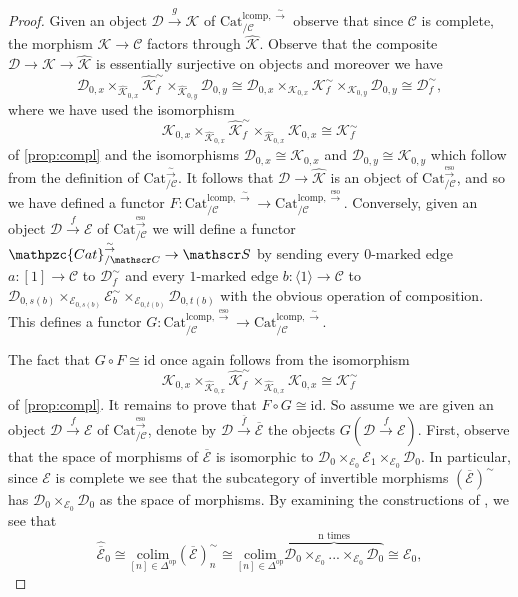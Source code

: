 \documentclass[a4paper, reqno]{amsart}
\theoremstyle{definition}
\newcommand\cC{\mathscr C}
\newcommand\cD{\mathscr D}
\newcommand\cE{\mathscr E}
\newcommand\cK{\mathscr K}
\newcommand\cS{\mathscr S}
\newcommand\id{\mathrm{id}}
\newcommand\op{\mathrm{op}}
\newcommand\cat{\mathrm{Cat}}
\newcommand\lcomp{\mathrm{lcomp}}
\newcommand\ccat{\mathpzc{Cat}}
\newcommand\colim{\mathrm{colim}}
\newcommand\wrr{{\overset{\sim}{\rightarrow}}}
\newcommand\eso{\mathrm{eso}}
\begin{document}
\begin{proof}
Given an object $\cD\xrightarrow{g}\cK$ of $\cat^{\lcomp,\wrr}_{/\cC}$ observe that since $\cC$ is complete, the morphism $\cK\rightarrow\cC$ factors through $\widehat{\cK}$. Observe that the composite $\cD\rightarrow\cK\rightarrow\widehat{\cK}$ is essentially surjective on objects and moreover we have 
\[\cD_{0,x}\times_{\widehat{\cK}_{0,x}}\widehat{\cK}^\sim_f\times_{\widehat{\cK}_{0,y}}\cD_{0,y}\cong \cD_{0,x}\times_{\cK_{0,x}}\cK^\sim_f\times_{\cK_{0,y}}\cD_{0,y}\cong\cD^\sim_f,\]
where we have used the isomorphism \[\cK_{0,x}\times_{\widehat{\cK}_{0,x}}\widehat{\cK}^\sim_f\times_{\widehat{\cK}_{0,x}}\cK_{0,x}\cong\cK^\sim_f\]
of \cref{prop:compl} and the isomorphisms $\cD_{0,x}\cong\cK_{0,x}$ and $\cD_{0,y}\cong\cK_{0,y}$ which follow from the definition of $\cat^\wrr_{/\cC}$. It follows that $\cD\rightarrow\widehat{\cK}$ is an object of $\cat^{\overset{\eso}{\rightarrow}}_{/\cC}$, and so we have defined a functor $F:\cat^{\lcomp,\wrr}_{/\cC}\rightarrow\cat^{\lcomp,\overset{\eso}{\rightarrow}}_{/\cC}$. Conversely, given an object $\cD\xrightarrow{f}\cE$ of $\cat^{\overset{\eso}{\rightarrow}}_{/\cC}$ we will define a functor $\ccat^\wrr_{/\cC}\rightarrow\cS$ by sending every $0$-marked edge $a:[1]\rightarrow\cC$ to $\cD^\sim_f$ and every $1$-marked edge $b:\langle1\rangle\rightarrow\cC$ to $\cD_{0,s(b)}\times_{\cE_{0,s(b)}}\cE^\sim_b\times_{\cE_{0,t(b)}}\cD_{0,t(b)}$ with the obvious operation of composition. This defines a functor $G:\cat^{\lcomp,\overset{\eso}{\rightarrow}}_{/\cC}\rightarrow\cat^{\lcomp,\wrr}_{/\cC}$.\par
The fact that $G\circ F\cong\id$ once again follows from the isomorphism \[\cK_{0,x}\times_{\widehat{\cK}_{0,x}}\widehat{\cK}^\sim_f\times_{\widehat{\cK}_{0,x}}\cK_{0,x}\cong\cK^\sim_f\]
of \cref{prop:compl}. It remains to prove that $F\circ G\cong\id$. So assume we are given an object $\cD\xrightarrow{f}\cE$ of $\cat^{\overset{\eso}{\rightarrow}}_{/\cC}$, denote by $\cD\xrightarrow{\overline{f}}\overline{\cE}$ the objects $G(\cD\xrightarrow{f}\cE)$. First, observe that the space of morphisms of $\overline{\cE}$ is isomorphic to $\cD_0\times_{\cE_0}\cE_1\times_{\cE_0}\cD_0$. In particular, since $\cE$ is complete we see that the subcategory of invertible morphisms $(\overline{\cE})^\sim$ has $\cD_0\times_{\cE_0}\cD_0$ as the space of morphisms. By examining the constructions of \cite{ayala2018flagged}, we see that 
\[\widehat{\overline{\cE}}_0\cong\underset{[n]\in\Delta^\op}{\colim}(\overline{\cE})^\sim_n\cong \underset{[n]\in\Delta^\op}{\colim}\overbrace{\cD_0\times_{\cE_0}...\times_{\cE_0}\cD_0}^\text{n times}\cong \cE_0,\]

\end{proof}
\end{document}
